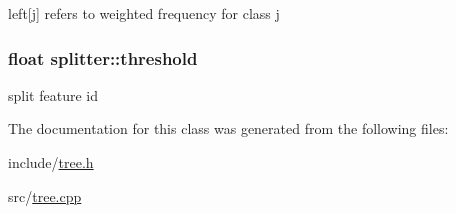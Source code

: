 left\mbox{[}j\mbox{]} refers to weighted frequency for class j \hypertarget{classsplitter_af40121f8411ad94f3f1968b1d50905ed}{
\subsubsection[{threshold}]{\setlength{\rightskip}{0pt plus 5cm}float splitter\+::threshold}}\label{classsplitter_af40121f8411ad94f3f1968b1d50905ed}
split feature id 

The documentation for this class was generated from the following files\+:\begin{DoxyCompactItemize}
\item 
include/\hyperlink{tree_8h}{tree.\+h}\item 
src/\hyperlink{tree_8cpp}{tree.\+cpp}\end{DoxyCompactItemize}
